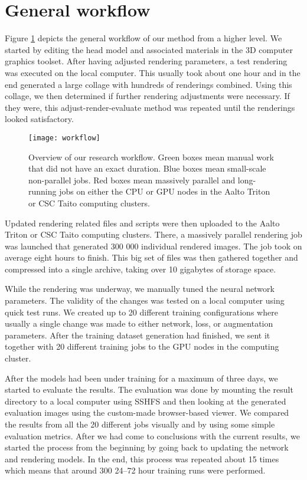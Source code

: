 \section{General workflow}
\label{sec:general_workflow}

Figure \ref{fig:workflow_1} depicts the general workflow of our method from a higher level. We started by editing the head model and associated materials in the \textcite{blender} 3D computer graphics toolset. After having adjusted rendering parameters, a test rendering was executed on the local computer. This usually took about one hour and in the end generated a large collage with hundreds of renderings combined. Using this collage, we then determined if further rendering adjustments were necessary. If they were, this adjust-render-evaluate method was repeated until the renderings looked satisfactory.

\begin{figure}
    \texttt{[image: workflow]}
    \caption[Research workflow]{Overview of our research workflow. Green boxes mean manual work that did not have an exact duration. Blue boxes mean small-scale non-parallel jobs. Red boxes mean massively parallel and long-running jobs on either the \ac{CPU} or \ac{GPU} nodes in the Aalto Triton or \ac{CSC} Taito computing clusters.}
    \label{fig:workflow_1}
\end{figure}

Updated rendering related files and scripts were then uploaded to the Aalto Triton or \ac{CSC} Taito computing clusters. There, a massively parallel rendering job was launched that generated 300 000 individual rendered images. The job took on average eight hours to finish. This big set of files was then gathered together and compressed into a single archive, taking over 10 gigabytes of storage space.

While the rendering was underway, we manually tuned the neural network parameters. The validity of the changes was tested on a local computer using quick test runs. We created up to 20 different training configurations where usually a single change was made to either network, loss, or augmentation parameters. After the training dataset generation had finished, we sent it together with 20 different training jobs to the \ac{GPU} nodes in the computing cluster.

After the models had been under training for a maximum of three days, we started to evaluate the results. The evaluation was done by mounting the result directory to a local computer using \ac{SSHFS} and then looking at the generated evaluation images using the custom-made browser-based viewer. We compared the results from all the 20 different jobs visually and by using some simple evaluation metrics. After we had come to conclusions with the current results, we started the process from the beginning by going back to updating the network and rendering models. In the end, this process was repeated about 15 times which means that around 300 24--72 hour training runs were performed.

